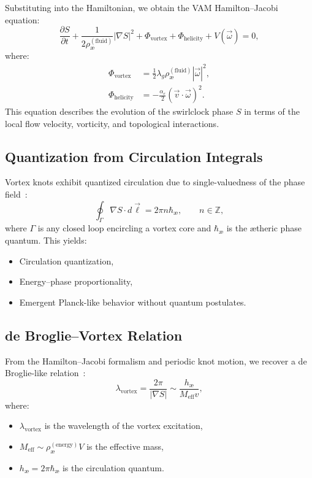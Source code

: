 Substituting into the Hamiltonian, we obtain the VAM Hamilton–Jacobi equation:
\begin{equation}
\frac{\partial S}{\partial t} + \frac{1}{2 \rho_\text{\ae}^{(\text{fluid})}} |\nabla S|^2
+ \Phi_\text{vortex} + \Phi_\text{helicity} + V(\vec{\omega}) = 0,
\end{equation}
where:
\begin{align*}
\Phi_\text{vortex} &= \frac{1}{2} \lambda_g \rho_\text{\ae}^{(\text{fluid})} |\vec{\omega}|^2, \\
\Phi_\text{helicity} &= -\frac{\alpha_e}{2} (\vec{v} \cdot \vec{\omega})^2.
\end{align*}
This equation describes the evolution of the swirlclock phase \( S \) in terms of the local flow velocity, vorticity, and topological interactions.


\subsection*{Quantization from Circulation Integrals}

Vortex knots exhibit quantized circulation due to single-valuedness of the phase field~\cite{Helmholtz1858,faddeev1997stable}:
\begin{equation}
\oint_\Gamma \nabla S \cdot d\vec{\ell} = 2\pi n \hbar_\text{\ae}, \qquad n \in \mathbb{Z},
\end{equation}
where \( \Gamma \) is any closed loop encircling a vortex core and \( \hbar_\text{\ae} \) is the ætheric phase quantum. This yields:
\begin{itemize}
    \item Circulation quantization,
    \item Energy–phase proportionality,
    \item Emergent Planck-like behavior without quantum postulates.
\end{itemize}

\subsection*{de Broglie--Vortex Relation}

From the Hamilton–Jacobi formalism and periodic knot motion, we recover a de Broglie-like relation~\cite{ranada1990topological}:
\begin{equation}
\lambda_\text{vortex} = \frac{2\pi}{|\nabla S|} \sim \frac{h_\text{\ae}}{M_\text{eff} v},
\end{equation}
where:
\begin{itemize}
    \item \( \lambda_\text{vortex} \) is the wavelength of the vortex excitation,
    \item \( M_\text{eff} \sim \rho_\text{\ae}^{(\text{energy})} V \) is the effective mass,
    \item \( h_\text{\ae} = 2\pi \hbar_\text{\ae} \) is the circulation quantum.
\end{itemize}

